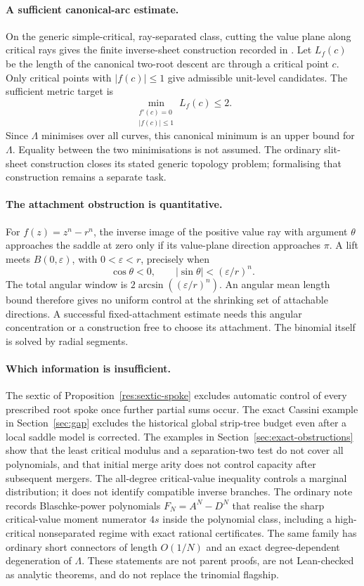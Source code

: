 \documentclass[11pt]{article}
\begin{document}
\paragraph{A sufficient canonical-arc estimate.}
On the generic simple-critical, ray-separated class, cutting the value plane
along critical rays gives the finite inverse-sheet construction recorded in
.
Let $L_f(c)$ be the length of the canonical two-root descent arc through a
critical point $c$.  Only critical points with $|f(c)|\le1$ give admissible
unit-level candidates.  The sufficient metric target is
\[
 \min_{\substack{f'(c)=0\\|f(c)|\le1}}L_f(c)\le2.
\]
Since $\Lambda$ minimises over all curves, this canonical minimum is an upper
bound for $\Lambda$.  Equality between the two minimisations is not assumed.
The ordinary slit-sheet construction closes its stated generic topology
problem; formalising that construction remains a separate task.

\paragraph{The attachment obstruction is quantitative.}
For $f(z)=z^n-r^n$, the inverse image of the positive value ray with argument
$\theta$ approaches the saddle at zero only if its value-plane direction
approaches $\pi$.  A lift meets $B(0,\varepsilon)$, with $0<\varepsilon<r$,
precisely when
\[
 \cos\theta<0,\qquad
 |\sin\theta|<(\varepsilon/r)^n.
\]
The total angular window is $2\arcsin((\varepsilon/r)^n)$.  An angular mean
length bound therefore gives no uniform control at the shrinking set of
attachable directions.  A successful fixed-attachment estimate needs this
angular concentration or a construction free to choose its attachment.
The binomial itself is solved by radial segments.

\paragraph{Which information is insufficient.}
The sextic of Proposition~\ref{res:sextic-spoke} excludes automatic control of
every prescribed root spoke once further partial sums occur.  The exact
Cassini example in Section~\ref{sec:gap} excludes the historical global
strip-tree budget even after a local saddle model is corrected.  The examples
in Section~\ref{sec:exact-obstructions} show that the least critical modulus
and a separation-two test do not cover all polynomials, and that initial merge
arity does not control capacity after subsequent mergers.  The all-degree
critical-value inequality controls a marginal distribution; it does not
identify compatible inverse branches.
The ordinary note
records Blaschke-power polynomials $F_N=A^N-D^N$ that realise the sharp
critical-value moment numerator $4s$ inside the polynomial class, including
a high-critical nonseparated regime with exact rational certificates.  The
same family has ordinary short connectors of length $O(1/N)$ and an exact
degree-dependent degeneration of $\Lambda$.  These statements are not
parent proofs, are not Lean-checked as analytic theorems, and do not
replace the trinomial flagship.
\end{document}
